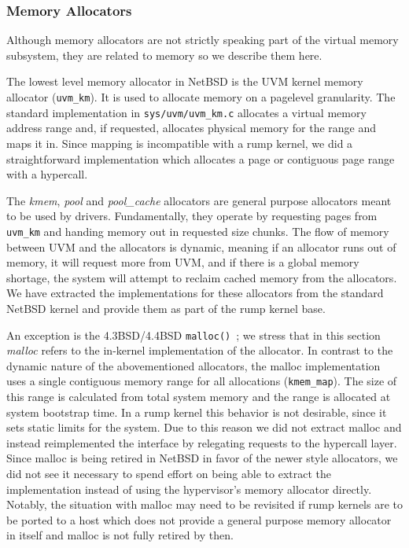 \subsubsection{Memory Allocators}
\label{sect:malloc}

Although memory allocators are not strictly speaking part of the
virtual memory subsystem, they are related to memory so we describe
them here.

The lowest level memory allocator in NetBSD is the UVM kernel memory
allocator (\verb+uvm_km+).  It is used to allocate memory on a
pagelevel granularity.  The standard implementation in
\verb+sys/uvm/uvm_km.c+ allocates a virtual memory address range
and, if requested, allocates physical memory for the range and maps
it in.  Since mapping is incompatible with a rump kernel, we did
a straightforward implementation which allocates a page or contiguous
page range with a hypercall.

The \textit{kmem}, \textit{pool} and \textit{pool\_cache} allocators
are general purpose allocators meant to be used by drivers.
Fundamentally, they operate by requesting pages from \verb+uvm_km+
and handing memory out in requested size chunks.  The flow of memory between
UVM and the allocators is dynamic, meaning if an allocator runs
out of memory, it will request more from UVM, and if there is a
global memory shortage, the system will attempt to reclaim cached
memory from the allocators.  We have extracted the implementations
for these allocators from the standard NetBSD kernel and provide
them as part of the rump kernel base.

An exception is the 4.3BSD/4.4BSD \texttt{malloc()}~\cite{mckusick:malloc};
we stress that in this section \textit{malloc} refers to the
in-kernel implementation of the allocator.  In contrast to the
dynamic nature of the abovementioned allocators, the malloc
implementation uses a single contiguous memory range for all
allocations (\verb+kmem_map+).  The size of this range is calculated
from total system memory and the range is allocated at system
bootstrap time.  In a rump kernel this behavior is not desirable,
since it sets static limits for the system.  Due to this reason we
did not extract malloc and instead reimplemented the interface by
relegating requests to the hypercall layer.  Since malloc is being
retired in NetBSD in favor of the newer style allocators, we did
not see it necessary to spend effort on being able to extract the
implementation instead of using the hypervisor's memory allocator
directly.  Notably, the situation with malloc may need to be revisited
if rump kernels are to be ported to a host which does not provide
a general purpose memory allocator in itself and malloc is not
fully retired by then.

